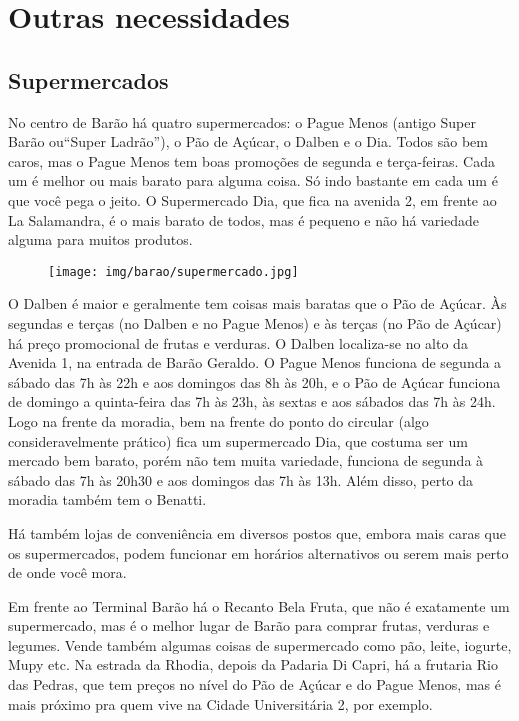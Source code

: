 
\section{Outras necessidades}
\subsection{Supermercados}

No centro de Barão há quatro supermercados: o Pague Menos (antigo Super Barão
ou``Super Ladrão''), o Pão de Açúcar, o Dalben e o Dia. Todos são bem caros,
mas o Pague Menos tem boas promoções de segunda e terça-feiras. Cada um é
melhor ou mais barato para alguma coisa. Só indo bastante em cada um é que você
pega o jeito. O Supermercado Dia, que fica na avenida 2, em frente ao La
Salamandra, é o mais barato de todos, mas é pequeno e não há variedade alguma
para muitos produtos.

\begin{figure}[h!]
  \centering
  \texttt{[image: img/barao/supermercado.jpg]}
\end{figure}

O Dalben é maior e geralmente tem coisas mais baratas que o Pão de Açúcar.
Às segundas e terças (no Dalben e no Pague Menos) e às terças (no Pão de
Açúcar) há preço promocional de frutas e verduras. O Dalben localiza-se no
alto da Avenida 1, na entrada de Barão Geraldo. O Pague Menos funciona de
segunda a sábado das 7h às 22h e aos domingos das 8h às 20h, e o Pão de
Açúcar funciona de domingo a quinta-feira das 7h às 23h, às sextas e aos
sábados das 7h às 24h. Logo na frente da moradia, bem na frente do ponto do
circular (algo consideravelmente prático) fica um supermercado Dia, que costuma
ser um mercado bem barato, porém não tem muita variedade, funciona de segunda à
sábado das 7h às 20h30 e aos domingos das 7h às 13h. Além disso, perto da
moradia também tem o Benatti.

Há também lojas de conveniência em diversos postos que, embora mais caras que
os supermercados, podem funcionar em horários alternativos ou serem mais perto
de onde você mora.

Em frente ao Terminal Barão há o Recanto Bela Fruta, que não é exatamente um
supermercado, mas é o melhor lugar de Barão para comprar frutas, verduras e
legumes. Vende também algumas coisas de supermercado como pão, leite, iogurte,
Mupy etc. Na estrada da Rhodia, depois da Padaria Di Capri, há a frutaria Rio
das Pedras, que tem preços no nível do Pão de Açúcar e do Pague Menos, mas é
mais próximo pra quem vive na Cidade Universitária 2, por exemplo.

